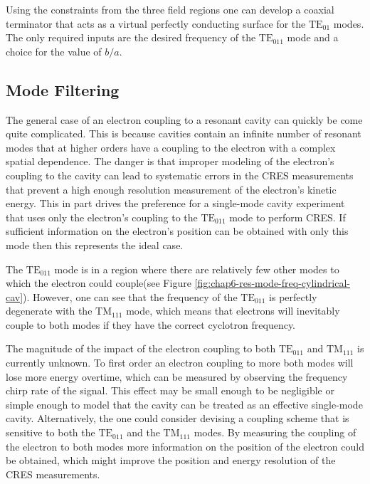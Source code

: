 Using the constraints from the three field regions one can develop a coaxial terminator that acts as a virtual perfectly conducting surface for the $\mathrm{TE}_{01}$ modes. The only required inputs are the desired frequency of the $\mathrm{TE}_{011}$ mode and a choice for the value of $b/a$. 

\subsection{Mode Filtering}
\label{sec:chap6-mode-filtering-techniques}

The general case of an electron coupling to a resonant cavity can quickly be come quite complicated. This is because cavities contain an infinite number of resonant modes that at higher orders have a coupling to the electron with a complex spatial dependence. The danger is that improper modeling of the electron's coupling to the cavity can lead to systematic errors in the CRES measurements that prevent a high enough resolution measurement of the electron's kinetic energy. This in part drives the preference for a single-mode cavity experiment that uses only the electron's coupling to the $\mathrm{TE}_{011}$ mode to perform CRES. If sufficient information on the electron's position can be obtained with only this mode then this represents the ideal case. 

The $\mathrm{TE}_{011}$ mode is in a region where there are relatively few other modes to which the electron could couple(see Figure \ref{fig:chap6-res-mode-freq-cylindrical-cav}). However, one can see that the frequency of the $\mathrm{TE}_{011}$ is perfectly degenerate with the $\mathrm{TM}_{111}$ mode, which means that electrons will inevitably couple to both modes if they have the correct cyclotron frequency. 

The magnitude of the impact of the electron coupling to both $\mathrm{TE}_{011}$ and $\mathrm{TM}_{111}$ is currently unknown. To first order an electron coupling to more both modes will lose more energy overtime, which can be measured by observing the frequency chirp rate of the signal. This effect may be small enough to be negligible or simple enough to model that the cavity can be treated as an effective single-mode cavity. Alternatively, the one could consider devising a coupling scheme that is sensitive to both the $\mathrm{TE}_{011}$ and the $\mathrm{TM}_{111}$ modes. By measuring the coupling of the electron to both modes more information on the position of the electron could be obtained, which might improve the position and energy resolution of the CRES measurements.

